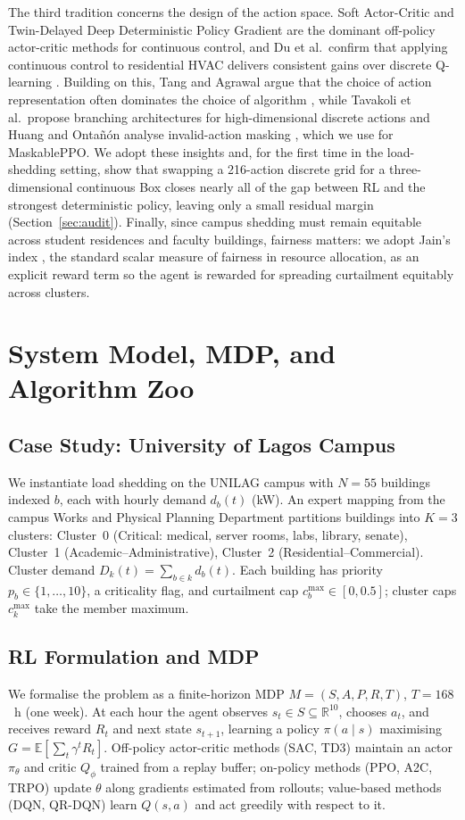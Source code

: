 \documentclass[9pt,conference]{IEEEtran}
\begin{document}
The third tradition concerns the design of the action space. Soft Actor-Critic \cite{haarnoja2018} and Twin-Delayed Deep Deterministic Policy Gradient \cite{fujimoto2018} are the dominant off-policy actor-critic methods for continuous control, and Du et al.\ confirm that applying continuous control to residential HVAC delivers consistent gains over discrete Q-learning \cite{du2021}. Building on this, Tang and Agrawal argue that the choice of action representation often dominates the choice of algorithm \cite{tang2020}, while Tavakoli et al.\ propose branching architectures for high-dimensional discrete actions \cite{tavakoli2018} and Huang and Onta\~n\'on analyse invalid-action masking \cite{huang2022}, which we use for MaskablePPO. We adopt these insights and, for the first time in the load-shedding setting, show that swapping a 216-action discrete grid for a three-dimensional continuous Box closes nearly all of the gap between RL and the strongest deterministic policy, leaving only a small residual margin (Section~\ref{sec:audit}). Finally, since campus shedding must remain equitable across student residences and faculty buildings, fairness matters: we adopt Jain's index \cite{jain1984}, the standard scalar measure of fairness in resource allocation, as an explicit reward term so the agent is rewarded for spreading curtailment equitably across clusters.

\section{System Model, MDP, and Algorithm Zoo}

\subsection{Case Study: University of Lagos Campus}
We instantiate load shedding on the UNILAG campus with $N=55$ buildings indexed $b$, each with hourly demand $d_b(t)$ (kW). An expert mapping from the campus Works and Physical Planning Department partitions buildings into $K=3$ clusters: Cluster~0 (Critical: medical, server rooms, labs, library, senate), Cluster~1 (Academic--Administrative), Cluster~2 (Residential--Commercial). Cluster demand $D_k(t)=\sum_{b\in k}d_b(t)$. Each building has priority $p_b\in\{1,\dots,10\}$, a criticality flag, and curtailment cap $c_b^{\max}\in[0,0.5]$; cluster caps $c_k^{\max}$ take the member maximum.

\subsection{RL Formulation and MDP}
We formalise the problem as a finite-horizon MDP $M=(S,A,P,R,T)$, $T=168$~h (one week). At each hour the agent observes $s_t\in S\subseteq\mathbb{R}^{10}$, chooses $a_t$, and receives reward $R_t$ and next state $s_{t+1}$, learning a policy $\pi(a\mid s)$ maximising $G=\mathbb{E}[\sum_t\gamma^tR_t]$. Off-policy actor-critic methods (SAC, TD3) maintain an actor $\pi_\theta$ and critic $Q_\phi$ trained from a replay buffer; on-policy methods (PPO, A2C, TRPO) update $\theta$ along gradients estimated from rollouts; value-based methods (DQN, QR-DQN) learn $Q(s,a)$ and act greedily with respect to it.
\end{document}

